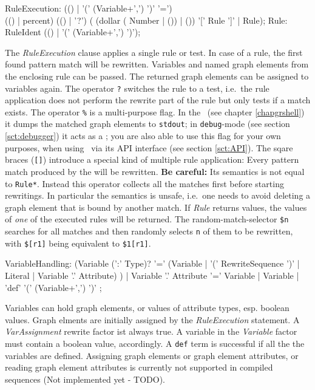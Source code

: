 \begin{rail}    
  RuleExecution: (() | '(' (Variable+',') ')' '=') \\ (() | percent) (() | '?') ( (dollar ( Number | ()) | ()) '[' Rule ']' | Rule);   
  Rule: RuleIdent (() | '(' (Variable+',') ')');
\end{rail}  
The \emph{RuleExecution} clause applies a single rule or test.
In case of a rule, the first found pattern match will be rewritten.
Variables and named graph elements from the enclosing rule can be passed.
The returned graph elements can be assigned to variables again.
The operator \texttt{?} switches the rule to a test, i.e.\ the rule application does not perform the rewrite part of the rule but only tests if a match exists.
The operator \texttt{\%} is a multi-purpose flag. 
In the \GrShell\ (see chapter \ref{chapgrshell}) it dumps the matched graph elements to \texttt{stdout};
in \texttt{debug}-mode (see section \ref{sct:debugger}) it acts as a ;
you are also able to use this flag for your own purposes, when using \GrG\ via its API interface (see section \ref{sct:API}).
The sqare braces (\texttt{[]}) introduce a special kind of multiple rule application:
Every pattern match produced by the will be rewritten.
\textbf{Be careful:} Its semantics is not equal to \texttt{Rule*}.
Instead this operator collects all the matches first before starting rewritings.
In particular the semantics is unsafe, i.e.\ one needs to avoid deleting a graph element that is bound by another match.
If \emph{Rule} returns values, the values of \emph{one} of the executed rules will be returned.
The random-match-selector \texttt{\$n} searches for all matches and then randomly selects \texttt{n} of them to be rewritten, with \texttt{\$[r1]} being equivalent to \texttt{\$1[r1]}.

\begin{rail}
  VariableHandling: 
    (Variable (':' Type)? '=' 
	  (Variable | 
      '(' RewriteSequence ')' | 
      Literal | 
	  Variable '.' Attribute)
    ) |
	Variable '.' Attribute '=' Variable |
    Variable |
    'def' '(' (Variable+',') ')'
;
\end{rail}\makeatother
Variables can hold graph elements, or values of attribute types, esp. boolean values.
Graph elments are initially assigned by the \emph{RuleExecution} statement.
A \emph{VarAssignment} rewrite factor ist always true.
A variable in the \emph{Variable} factor must contain a boolean value, accordingly.
A \texttt{def} term is successful if all the the variables are defined.
Assigning graph elements or graph element attributes, or reading graph element attributes is currently not supported in compiled sequences (Not implemented yet - TODO).

